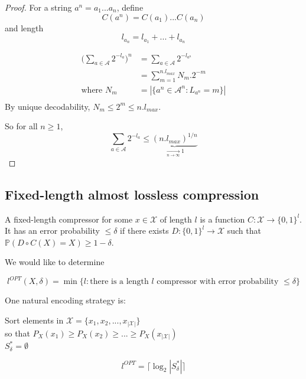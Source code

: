 \begin{proof}
For a string $a^n=a_1...a_n$, define 
\[C(a^n)=C(a_1)...C(a_n)\]
and length \[l_{a_n}=l_{a_1}+...+l_{a_n}\]

\begin{align*}
\Big( \sum_{a\in \mathcal{A}} 2^{-l_a}\Big)^n & = \sum_{a\in \mathcal{A}} 2^{-l_{a^n}}\\
& = \sum_{m=1}^{n.l_{max}} N_m.2^{-m}\\
\text{where } N_m & = |\{a^n\in \mathcal{A}^n:L_{a^n}=m\}|\\ 
\end{align*}
By unique decodability, $N_m\leq 2^m \leq n.l_{max}$.

So for all $n\geq 1$,
\[\sum_{a\in \mathcal{A}} 2^{-l_a} \leq \underbrace{(n.l_{max})^{1/n}}_{\xrightarrow [n \rightarrow \infty]{} 1}\]
\end{proof}

\subsection{Fixed-length almost lossless compression}
\begin{defi}
A fixed-length compressor for some $x\in \mathcal{X}$ of length $l$ is a function $C:\mathcal{X}\to \{0,1\}^l$. It has an error probability $\leq \delta$ if there exists $D:\{0,1\}^l \to \mathcal{X}$ such that $\mathbb{P}(D \circ C(X)=X)\geq 1-\delta$.
\end{defi}

We would like to determine
\begin{defi}
\[ l^{OPT}(X,\delta)=\min\{l:\text{there is a length $l$ compressor with error probability $\leq \delta$}\}\]
\end{defi}

\newpage

One natural encoding strategy is:
\begin{algorithm}
Sort elements in $\mathcal{X}=\{x_1,x_2,...,x_{|\mathcal{X}|}\}$\\
so that $P_X(x_1)\geq P_X(x_2)\geq ... \geq P_X(x_{|\mathcal{X}|})$\\
$S_\delta^*=\emptyset$\\
\end{algorithm}

\begin{thm}
\[ l^{OPT}=\lceil \log_2 |S_\delta^* | \rceil\]
\end{thm}

